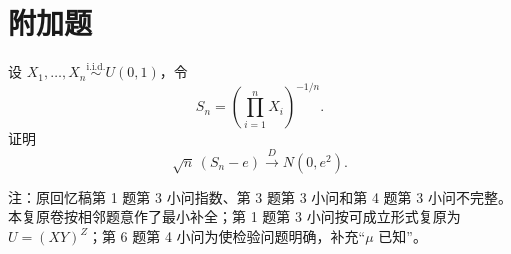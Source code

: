 \documentclass[UTF8,zihao=-4,fontset=windows]{ctexart}
\newcommand{\iid}{\overset{\mathrm{i.i.d.}}{\sim}}
\begin{document}
\section*{附加题}
设 $X_1,\ldots,X_n \iid U(0,1)$，令
\[
  S_n=\left(\prod_{i=1}^n X_i\right)^{-1/n}.
\]
证明
\[
  \sqrt n\,(S_n-e)\xrightarrow{D}N(0,e^2).
\]

\vspace{1em}
{\small 注：原回忆稿第 1 题第 3 小问指数、第 3 题第 3 小问和第 4 题第 3 小问不完整。本复原卷按相邻题意作了最小补全；第 1 题第 3 小问按可成立形式复原为 $U=(XY)^Z$；第 6 题第 4 小问为使检验问题明确，补充“$\mu$ 已知”。}
\end{document}
